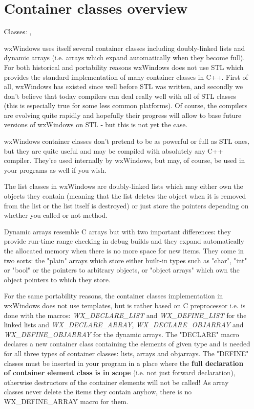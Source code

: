 \section{Container classes overview}\label{wxcontaineroverview}

Classes: , 

wxWindows uses itself several container classes including doubly-linked lists
and dynamic arrays (i.e. arrays which expand automatically when they become
full). For both historical and portability reasons wxWindows does not
use STL which provides the standard implementation of many container classes in
C++. First of all, wxWindows has existed since well before STL was written, and
secondly we don't believe that today compilers can deal really well with all of
STL classes (this is especially true for some less common platforms). Of
course, the compilers are evolving quite rapidly and hopefully their progress
will allow to base future versions of wxWindows on STL - but this is not yet
the case.

wxWindows container classes don't pretend to be as powerful or full as STL
ones, but they are quite useful and may be compiled with absolutely any C++
compiler. They're used internally by wxWindows, but may, of course, be used in
your programs as well if you wish.

The list classes in wxWindows are doubly-linked lists which may either own the
objects they contain (meaning that the list deletes the object when it is
removed from the list or the list itself is destroyed) or just store the
pointers depending on whether you called or not 
 method.

Dynamic arrays resemble C arrays but with two important differences: they
provide run-time range checking in debug builds and they expand automatically
the allocated memory when there is no more space for new items. They come in
two sorts: the "plain" arrays which store either built-in types such as "char",
"int" or "bool" or the pointers to arbitrary objects, or "object arrays" which
own the object pointers to which they store.

For the same portability reasons, the container classes implementation in wxWindows
does not use templates, but is rather based on C preprocessor i.e. is done with
the macros: {\it WX\_DECLARE\_LIST} and {\it WX\_DEFINE\_LIST} for the linked
lists and {\it WX\_DECLARE\_ARRAY}, {\it WX\_DECLARE\_OBJARRAY} and {\it WX\_DEFINE\_OBJARRAY} for
the dynamic arrays. The "DECLARE" macro declares a
new container class containing the elements of given type and is needed for all
three types of container classes: lists, arrays and objarrays. The "DEFINE"
classes must be inserted in your program in a place where the {\bf full
declaration of container element class is in scope} (i.e. not just forward
declaration), otherwise destructors of the container elements will not be
called! As array classes never delete the items they contain anyhow, there is
no WX\_DEFINE\_ARRAY macro for them.

